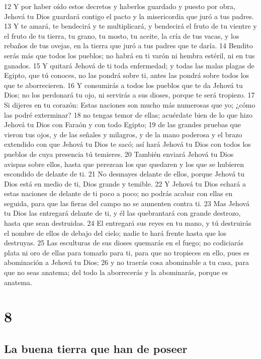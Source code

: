 12 Y por haber oído estos decretos y haberlos guardado y puesto por obra, Jehová tu Dios guardará contigo el pacto y la misericordia que juró a tus padres.
13 Y te amará, te bendecirá y te multiplicará, y bendecirá el fruto de tu vientre y el fruto de tu tierra, tu grano, tu mosto, tu aceite, la cría de tus vacas, y los rebaños de tus ovejas, en la tierra que juró a tus padres que te daría.
14 Bendito serás más que todos los pueblos; no habrá en ti varón ni hembra estéril, ni en tus ganados.
15 Y quitará Jehová de ti toda enfermedad; y todas las malas plagas de Egipto, que tú conoces, no las pondrá sobre ti, antes las pondrá sobre todos los que te aborrecieren.
16 Y consumirás a todos los pueblos que te da Jehová tu Dios; no los perdonará tu ojo, ni servirás a sus dioses, porque te será tropiezo.
17 Si dijeres en tu corazón: Estas naciones son mucho más numerosas que yo; ¿cómo las podré exterminar?
18 no tengas temor de ellas; acuérdate bien de lo que hizo Jehová tu Dios con Faraón y con todo Egipto;
19 de las grandes pruebas que vieron tus ojos, y de las señales y milagros, y de la mano poderosa y el brazo extendido con que Jehová tu Dios te sacó; así hará Jehová tu Dios con todos los pueblos de cuya presencia tú temieres.
20 También enviará Jehová tu Dios avispas sobre ellos, hasta que perezcan los que quedaren y los que se hubieren escondido de delante de ti.
21 No desmayes delante de ellos, porque Jehová tu Dios está en medio de ti, Dios grande y temible.
22 Y Jehová tu Dios echará a estas naciones de delante de ti poco a poco; no podrás acabar con ellas en seguida, para que las fieras del campo no se aumenten contra ti.
23 Mas Jehová tu Dios las entregará delante de ti, y él las quebrantará con grande destrozo, hasta que sean destruidas.
24 El entregará sus reyes en tu mano, y tú destruirás el nombre de ellos de debajo del cielo; nadie te hará frente hasta que los destruyas.
25 Las esculturas de sus dioses quemarás en el fuego; no codiciarás plata ni oro de ellas para tomarlo para ti, para que no tropieces en ello, pues es abominación a Jehová tu Dios;
26 y no traerás cosa abominable a tu casa, para que no seas anatema; del todo la aborrecerás y la abominarás, porque es anatema.

\chapter{8}

\section{La buena tierra que han de poseer}

